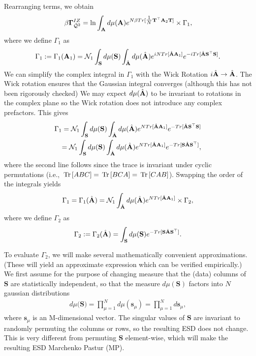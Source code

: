 Rearranging terms, we obtain 
\begin{align}
\label{eqn:IZG_Gamma1}
\beta\mathbf{\Gamma}^{IZ}_{\bar{\mathcal{Q}}^{2}} =  \ln\int_{\mathbf{A}}  d\mu(\mathbf{A}) 
            e^{  N\beta Tr[\tfrac{1}{N} {\mathbf{T}}^{\top}\mathbf{A}_{2}{\mathbf{T}} ] } \times
           \Gamma_1  ,
\end{align}
where we define $\Gamma_1$ as 
\begin{align}
\Gamma_1 := \Gamma_1(\mathbf{A}_{1}) 
         = \mathcal{N}_1 \int_{{\mathbf{S}}} d\mu(\mathbf{S}) 
                           \int_{\hat{\mathbf{A}}} d\mu(\hat{\mathbf{A}}) e^{ iN Tr[ \hat{\mathbf{A}}\mathbf{A}_{1} ] }
                                                           e^{ -i Tr[ \hat{\mathbf{A}}\mathbf{S}^{\top} \mathbf{S} ] } .
\end{align}
We can simplify the complex integral in $\Gamma_1$ with the Wick Rotation $i\hat{\mathbf{A}}\rightarrow\hat{\mathbf{A}}$.
The Wick rotation ensures that the Gaussian integral converges (although this has not been rigorously checked)
We may expect $d\mu(\hat{\mathbf{A}})$ to be invariant to rotations in the complex plane
so the Wick rotation does not introduce any complex prefactors.  This gives
\begin{eqnarray}
\label{eqn:QWick}
\Gamma_1 = \mathcal{N}_1 \int_{{\mathbf{S}}} d\mu(\mathbf{S})\int_{\hat{\mathbf{A}}} d\mu(\hat{\mathbf{A}}) 
           e^{ N  Tr[ \hat{\mathbf{A}}\mathbf{A}_{1} ] }
           e^{ - Tr[ \hat{\mathbf{A}}\mathbf{S}^{\top} \mathbf{S}] } \\
\label{eqn:QWick2}
         = \mathcal{N}_1 \int_{{\mathbf{S}}} d\mu(\mathbf{S})\int_{\hat{\mathbf{A}}} d\mu(\hat{\mathbf{A}}) 
           e^{ N  Tr[ \hat{\mathbf{A}}\mathbf{A}_{1} ] }
           e^{ -Tr[ \mathbf{S}\hat{\mathbf{A}}\mathbf{S}^{\top} ] } ,
\end{eqnarray}
where the second line follows since the trace is invariant under cyclic permutations (i.e., $\mbox{}\operatorname{Tr}\left[ABC\right]=\mbox{}\operatorname{Tr}\left[BCA\right]=\mbox{}\operatorname{Tr}\left[CAB\right]$).
Swapping the order of the integrals yields
\begin{eqnarray}
\label{eqn:QWick3}
\Gamma_1 =\Gamma_1(\hat{\mathbf{A}})  = \mathcal{N}_1
           \int_{\hat{\mathbf{A}}} d\mu(\hat{\mathbf{A}}) 
           e^{ N Tr[\hat{\mathbf{A}}\mathbf{A}_{1} ]}\times
           \Gamma_2  ,
\end{eqnarray}
where we define $\Gamma_2$ as
\begin{equation*}
\Gamma_2 := \Gamma_2(\hat{\mathbf{A}})
         = \int_{{\mathbf{S}}} d\mu(\mathbf{S})
           e^{ -Tr[ \mathbf{S}\hat{\mathbf{A}}\mathbf{S}^{\top} ] } .
\end{equation*}

To evaluate $\Gamma_2$, we will make several mathematically convenient approximations.
(These will yield an approximate expression which can be verified empirically.)
%
We first assume for the purpose of changing measure that the (data) columns of $\mathbf{S}$ are
statistically independent, so that the measure $d\mu(\mathbf{S})$ factors into $N$ gaussian distributions
\begin{align}
\label{eqn:dMuS}
d\mu(\mathbf{S)} = \prod_{\mu=1}^{N}d\mu(\mathbf{s}_{\mu})=\prod_{\mu=1}^{N}d\mathbf{s}_{\mu} ,
\end{align}
where $\mathbf{s}_{\mu}$ is an M-dimensional vector.
The singular values of $\mathbf{S}$ are invariant to randomly permuting the columns or rows,
so the resulting ESD does not change.  
This is very different from permuting $\mathbf{S}$ element-wise, which will make the resulting ESD Marchenko Pastur (MP).


